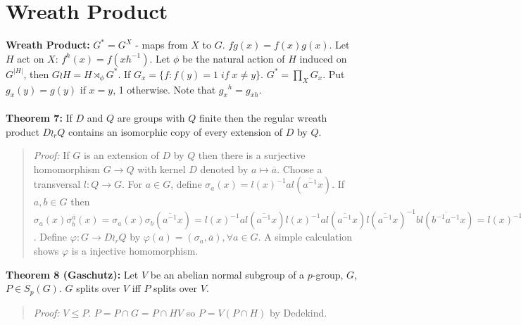 \section {Wreath Product}
{\bf Wreath Product:} $G^*= G^{X}$ - maps from $X$ to $G$.  $fg(x)= f(x) g(x)$.
Let $H$ act on $X$: $f^h(x)= f(xh^{-1})$.  Let $\phi$ be the natural action of
$H$ induced on $G^{|H|}$, then $G \wr H = H \rtimes_{\phi} G^*$. If $G_x =
\{f: f(y)= 1 \; if \; x \ne y \}$.  $G^* = \prod_X G_x$.
Put $g_x (y)= g (y)$ if $x=y$, 1 otherwise.  Note that
${g_x}^h= g_{xh}$.
\\
\\
{\bf Theorem 7:} If $D$ and $Q$ are groups with $Q$ finite then the regular wreath product
$D \wr_r Q$ contains an isomorphic copy of every extension of $D$ by $Q$.
\begin{quote}
\emph{Proof:}  If $G$ is an extension of $D$ by $Q$ then there is a surjective homomorphism
$G \rightarrow Q$ with kernel $D$ denoted by $a \mapsto {\overline a}$.
Choose a transversal $l: Q \rightarrow G$.  For $a \in G$, define $\sigma_a(x) = l(x)^{-1} a l({\overline {a^{-1}}} x)$.  If $a, b \in G$ then
$
\sigma_a(x) \sigma_b^{\overline a}(x) =
\sigma_a(x) \sigma_b({\overline {a^{-1}}} x) =
l(x)^{-1} a l({\overline {a^{-1}}} x)
l(x)^{-1} a l({\overline {a^{-1}}} x)
l({\overline {a^{-1}}} x)^{-1} b l({\overline { b^{-1} a^{-1}}} x) =
l(x)^{-1} a b l({\overline { b^{-1} a^{-1}}} x) = \sigma_{ab}(x)$.  Define $\varphi : G \rightarrow D \wr_r Q$ by $\varphi(a) = (\sigma_a, {\overline a}), \forall a \in G$.  A simple calculation shows
$\varphi$ is a injective homomorphism.
\end{quote}
{\bf Theorem 8 (Gaschutz):} Let $V$ be an abelian normal subgroup of a $p$-group, $G$, $P \in S_p(G)$.
$G$ splits over $V$ iff $P$ splits over $V$.
\begin{quote}
\emph{Proof:}
$V \leq P$.  $P = P \cap G = P \cap HV$ so $P = V (P \cap H)$ by Dedekind.
\end{quote}
